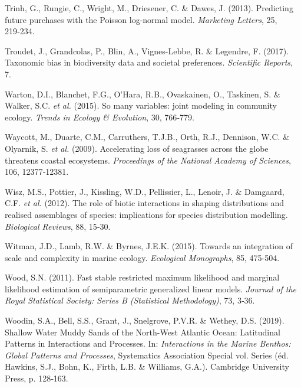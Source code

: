 \documentclass[12pt,]{article}
\newlength{\cslhangindent}
\newenvironment{cslreferences}%
  {\setlength{\parindent}{0pt}%
  \everypar{\setlength{\hangindent}{\cslhangindent}}\ignorespaces}%
  {\par}
\begin{document}
\begin{cslreferences}
\leavevmode\hypertarget{ref-Trinh_2013}{}%
Trinh, G., Rungie, C., Wright, M., Driesener, C. \& Dawes, J. (2013).
Predicting future purchases with the Poisson log-normal model.
\emph{Marketing Letters}, 25, 219‑234.

\leavevmode\hypertarget{ref-Troudet_2017}{}%
Troudet, J., Grandcolas, P., Blin, A., Vignes-Lebbe, R. \& Legendre, F.
(2017). Taxonomic bias in biodiversity data and societal preferences.
\emph{Scientific Reports}, 7.

\leavevmode\hypertarget{ref-warton2015}{}%
Warton, D.I., Blanchet, F.G., O'Hara, R.B., Ovaskainen, O., Taskinen, S.
\& Walker, S.C. \emph{et al.} (2015). So many variables: joint modeling
in community ecology. \emph{Trends in Ecology \& Evolution}, 30,
766‑779.

\leavevmode\hypertarget{ref-Waycott_2009}{}%
Waycott, M., Duarte, C.M., Carruthers, T.J.B., Orth, R.J., Dennison,
W.C. \& Olyarnik, S. \emph{et al.} (2009). Accelerating loss of
seagrasses across the globe threatens coastal ecosystems.
\emph{Proceedings of the National Academy of Sciences}, 106,
12377‑12381.

\leavevmode\hypertarget{ref-Wisz_2012}{}%
Wisz, M.S., Pottier, J., Kissling, W.D., Pellissier, L., Lenoir, J. \&
Damgaard, C.F. \emph{et al.} (2012). The role of biotic interactions in
shaping distributions and realised assemblages of species: implications
for species distribution modelling. \emph{Biological Reviews}, 88,
15‑30.

\leavevmode\hypertarget{ref-Witman_2015}{}%
Witman, J.D., Lamb, R.W. \& Byrnes, J.E.K. (2015). Towards an
integration of scale and complexity in marine ecology. \emph{Ecological
Monographs}, 85, 475‑504.

\leavevmode\hypertarget{ref-Wood_2011}{}%
Wood, S.N. (2011). Fast stable restricted maximum likelihood and
marginal likelihood estimation of semiparametric generalized linear
models. \emph{Journal of the Royal Statistical Society: Series B
(Statistical Methodology)}, 73, 3‑36.

\leavevmode\hypertarget{ref-Woodin_2019}{}%
Woodin, S.A., Bell, S.S., Grant, J., Snelgrove, P.V.R. \& Wethey, D.S.
(2019). Shallow Water Muddy Sands of the North-West Atlantic Ocean:
Latitudinal Patterns in Interactions and Processes. In:
\emph{Interactions in the Marine Benthos: Global Patterns and
Processes}, Systematics Association Special vol. Series (éd. Hawkins,
S.J., Bohn, K., Firth, L.B. \& Williams, G.A.). Cambridge University
Press, p. 128‑163.


\end{cslreferences}
\end{document}
